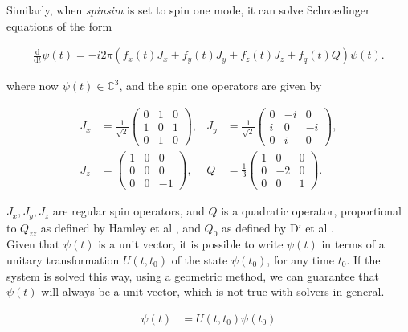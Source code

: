 \documentclass{jors}
\begin{document}
			Similarly, when \emph{spinsim} is set to spin one mode, it can solve Schroedinger equations of the form

			\begin{align*}
				\frac{\mathrm{d}}{\mathrm{d}t}\psi(t) = -i 2\pi (f_x(t) J_x + f_y(t) J_y + f_z(t) J_z + f_q(t) Q) \psi(t).
			\end{align*}

			where now \(\psi(t) \in \mathbb{C}^3\), and the spin one operators are given by

			\begin{align*}
				J_x &= \frac{1}{\sqrt{2}}\begin{pmatrix}
					0 & 1 & 0 \\
					1 & 0 & 1 \\
					0 & 1 & 0
				\end{pmatrix},&
				J_y &= \frac{1}{\sqrt{2}}\begin{pmatrix}
					0 & -i &  0 \\
					i &  0 & -i \\
					0 &  i &  0
				\end{pmatrix},\\
				J_z &= \begin{pmatrix}
					1 & 0 &  0 \\
					0 & 0 &  0 \\
					0 & 0 & -1
				\end{pmatrix},&
				Q &= \frac{1}{3}\begin{pmatrix}
					1 &  0 & 0 \\
					0 & -2 & 0 \\
					0 &  0 & 1
				\end{pmatrix}.
			\end{align*}

			\(J_x, J_y, J_z\) are regular spin operators, and \(Q\) is a quadratic operator, proportional to \(Q_{zz}\) as defined by Hamley et al \cite{hamley_spin-nematic_2012}, and \(Q_0\) as defined by Di et al \cite{di_dipolequadrupole_2010}.\\

			Given that \(\psi(t)\) is a unit vector, it is possible to write \(\psi(t)\) in terms of a unitary transformation \(U(t, t_0)\) of the state \(\psi(t_0)\), for any time \(t_0\). If the system is solved this way, using a geometric method, we can guarantee that \(\psi(t)\) will always be a unit vector, which is not true with solvers in general.
			
			\begin{align*}
				\psi(t) &= U(t, t_0)\psi(t_0)
			\end{align*}
			
\end{document}
